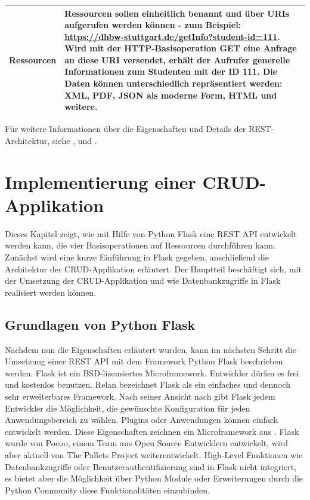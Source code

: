 \documentclass[a4paper,titlepage,halfparskip,12pt,listof=numbered]{scrreprt}
\begin{document}
\begin{onehalfspacing}
\begin{table}[h]
\begin{tabular}{|l|p{}|}
\hline
\textbf{Ressourcen} & Ressourcen sollen einheitlich benannt und über \acs{URI}s aufgerufen werden können - zum Beispiel: \url{https://dhbw-stuttgart.de/getInfo?student-id=111}. Wird mit der \acs{HTTP}-Basisoperation GET eine Anfrage an diese \acs{URI} versendet, erhält der Aufrufer generelle Informationen zum Studenten mit der ID 111. Die Daten können unterschiedlich repräsentiert werden: \acs{XML}, \acs{PDF}, \acs{JSON} als moderne Form, \acs{HTML} und weitere.\\
\hline
\end{tabular}
\label{tab:EigenschaftenREST}
\end{table}

Für weitere Informationen über die Eigenschaften und Details der \ac{REST}-Architektur, siehe \cite{fieldingREST}, \cite{andrew2008distributed} und \cite{pythonFlaskREST}.

\chapter{Implementierung einer CRUD-Applikation}
\label{sec:ImplementierungCRUDapp}

Dieses Kapitel zeigt, wie mit Hilfe von Python Flask eine \ac{REST} \ac{API} entwickelt werden kann, die vier Basisoperationen auf Ressourcen durchführen kann. Zunächst wird eine kurze Einführung in Flask gegeben, anschließend die Architektur der CRUD-Applikation erläutert. Der Hauptteil beschäftigt sich, mit der Umsetzung der CRUD-Applikation und wie Datenbankzugriffe in Flask realisiert werden können.

\section{Grundlagen von Python Flask}
\label{sec:Flask}
Nachdem nun die Eigenschaften erläutert wurden, kann im nächsten Schritt die Umsetzung einer \ac{REST} \ac{API} mit dem Framework Python Flask beschrieben werden. Flask ist ein \ac{BSD}-lizensiertes Microframework. Entwickler dürfen es frei und kostenlos benutzen. Relan \cite[S.1]{pythonFlaskREST} bezeichnet Flask als ein einfaches und dennoch sehr erweiterbares Framework. Nach seiner Ansicht nach gibt Flask jedem Entwickler die Möglichkeit, die gewünschte Konfiguration für jeden Anwendungsbereich zu wählen. Plugins oder Anwendungen können einfach entwickelt werden. Diese Eigenschaften zeichnen ein Microframework aus \cite{flaskMicroDescription}. Flask wurde von Pocoo, einem Team aus Open Source Entwicklern entwickelt, wird aber aktuell von The Pallets Project weiterentwickelt. High-Level Funktionen wie Datenbankzugriffe oder Benutzerauthentifizierung sind in Flask nicht integriert, es bietet aber die Möglichkeit über Python Module oder Erweiterungen durch die Python Community diese Funktionalitäten einzubinden.\cite[S.1]{pythonFlaskREST}


\end{onehalfspacing}
\end{document}
